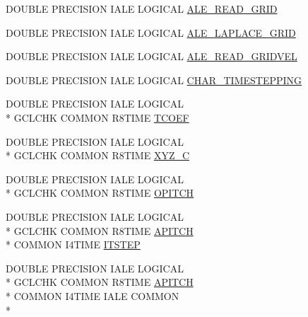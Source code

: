 \begin{DoxyCompactItemize}
\item 
D\-O\-U\-B\-L\-E P\-R\-E\-C\-I\-S\-I\-O\-N I\-A\-L\-E L\-O\-G\-I\-C\-A\-L \hyperlink{time_8com_a71c7e57765003ddd8b585866e5e50ef6}{A\-L\-E\-\_\-\-R\-E\-A\-D\-\_\-\-G\-R\-I\-D}
\item 
D\-O\-U\-B\-L\-E P\-R\-E\-C\-I\-S\-I\-O\-N I\-A\-L\-E L\-O\-G\-I\-C\-A\-L \hyperlink{time_8com_a57116ad42b245777051c70e6c93c066f}{A\-L\-E\-\_\-\-L\-A\-P\-L\-A\-C\-E\-\_\-\-G\-R\-I\-D}
\item 
D\-O\-U\-B\-L\-E P\-R\-E\-C\-I\-S\-I\-O\-N I\-A\-L\-E L\-O\-G\-I\-C\-A\-L \hyperlink{time_8com_af7405440522f436430fe3b752151999b}{A\-L\-E\-\_\-\-R\-E\-A\-D\-\_\-\-G\-R\-I\-D\-V\-E\-L}
\item 
D\-O\-U\-B\-L\-E P\-R\-E\-C\-I\-S\-I\-O\-N I\-A\-L\-E L\-O\-G\-I\-C\-A\-L \hyperlink{time_8com_a6cba47ee139037f9caf4bca556c0a75a}{C\-H\-A\-R\-\_\-\-T\-I\-M\-E\-S\-T\-E\-P\-P\-I\-N\-G}
\item 
D\-O\-U\-B\-L\-E P\-R\-E\-C\-I\-S\-I\-O\-N I\-A\-L\-E L\-O\-G\-I\-C\-A\-L \\*
G\-C\-L\-C\-H\-K C\-O\-M\-M\-O\-N R8\-T\-I\-M\-E \hyperlink{time_8com_a16f51598c500f622ff8f3d7810f8e3ad}{T\-C\-O\-E\-F}
\item 
D\-O\-U\-B\-L\-E P\-R\-E\-C\-I\-S\-I\-O\-N I\-A\-L\-E L\-O\-G\-I\-C\-A\-L \\*
G\-C\-L\-C\-H\-K C\-O\-M\-M\-O\-N R8\-T\-I\-M\-E \hyperlink{time_8com_a1c3e27e3ce9b3b625cbf7df4bc15afd1}{X\-Y\-Z\-\_\-\-C}
\item 
D\-O\-U\-B\-L\-E P\-R\-E\-C\-I\-S\-I\-O\-N I\-A\-L\-E L\-O\-G\-I\-C\-A\-L \\*
G\-C\-L\-C\-H\-K C\-O\-M\-M\-O\-N R8\-T\-I\-M\-E \hyperlink{time_8com_a00fbf27574a9140219cb0fadfbdf5576}{O\-P\-I\-T\-C\-H}
\item 
D\-O\-U\-B\-L\-E P\-R\-E\-C\-I\-S\-I\-O\-N I\-A\-L\-E L\-O\-G\-I\-C\-A\-L \\*
G\-C\-L\-C\-H\-K C\-O\-M\-M\-O\-N R8\-T\-I\-M\-E \hyperlink{time_8com_a45717e5c9ccf2afd6bb9e4efe67c74e6}{A\-P\-I\-T\-C\-H} \\*
C\-O\-M\-M\-O\-N I4\-T\-I\-M\-E \hyperlink{time_8com_a786e3f66d928497c6f34694ad75543f4}{I\-T\-S\-T\-E\-P}
\item 
D\-O\-U\-B\-L\-E P\-R\-E\-C\-I\-S\-I\-O\-N I\-A\-L\-E L\-O\-G\-I\-C\-A\-L \\*
G\-C\-L\-C\-H\-K C\-O\-M\-M\-O\-N R8\-T\-I\-M\-E \hyperlink{time_8com_a45717e5c9ccf2afd6bb9e4efe67c74e6}{A\-P\-I\-T\-C\-H} \\*
C\-O\-M\-M\-O\-N I4\-T\-I\-M\-E I\-A\-L\-E C\-O\-M\-M\-O\-N \\*

\end{DoxyCompactItemize}
